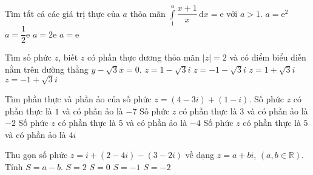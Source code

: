 \begin{ex}%
Tìm tất cả các giá trị thực của $a$ thỏa mãn $\displaystyle\int\limits_{1}^{a} \dfrac{x+1}{x}\mathrm{\,d}x =\mathrm{e} $ với $a>1$.
\choice
{$a=\mathrm{e}^2$}
{$a=\dfrac{1}{2}\mathrm{e}$}
{$a=2\mathrm{e}$}
{\True $a=\mathrm{e}$}
\end{ex}

\begin{ex}%
Tìm số phức $z$, biết $z$ có phần thực dương thỏa mãn $|z|=2$ và có điểm biểu diễn nằm trên đường thẳng $y-\sqrt{3}x=0$.
\choice
{$z=1-\sqrt{3}i$}
{\True $z=-1-\sqrt{3}i$}
{$z=1+\sqrt{3}i$}
{$z=-1+\sqrt{3}i$}
\end{ex}

\begin{ex}%
Tìm phần thực và phần ảo của số phức $z=(4-3i)+(1-i)$.
\choice
{Số phức $z$ có phần thực là $1$ và có phần ảo là $-7$}
{Số phức $z$ có phần thực là $3$ và có phần ảo là $-2$}
{\True Số phức $z$ có phần thực là $5$ và có phần ảo là $-4$}
{Số phức $z$ có phần thực là $5$ và có phần ảo là $4i$}
\end{ex}

\begin{ex}%
Thu gọn số phức $z=i+(2-4i)-(3-2i)$ về dạng $z=a+bi$, $(a,b\in\mathbb{R})$. Tính $S=a-b$.
\choice
{$S=2$}
{\True $S=0$}
{$S=-1$}
{$S=-2$}
\end{ex}

